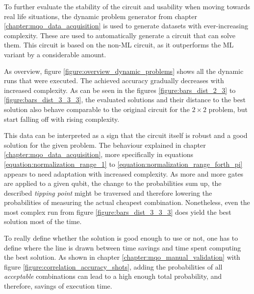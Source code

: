 To further evaluate the stability of the circuit and usability when moving towards real life situations, the dynamic problem generator from chapter \ref{chapter:mqo_data_acquisition} is used to generate datasets with ever-increasing complexity. These are used to automatically generate a circuit that can solve them. This circuit is based on the non-ML circuit, as it outperforms the ML variant by a considerable amount. \par
As overview, figure \ref{figure:overview_dynamic_problems} shows all the dynamic runs that were executed. The achieved accuracy gradually decreases with increased complexity. As can be seen in the figures \ref{figure:bars_dist_2_3} to \ref{figure:bars_dist_3_3_3}, the evaluated solutions and their distance to the best solution also behave comparable to the original circuit for the $2\times2$ problem, but start falling off with rising complexity. \par
This data can be interpreted as a sign that the circuit itself is robust and a good solution for the given problem. The behaviour explained in chapter \ref{chapter:mqo_data_acquisition}, more specifically in equations \ref{equation:normalization_range_1} to \ref{equation:normalization_range_forth_pi} appears to need adaptation with increased complexity. As more and more gates are applied to a given qubit, the change to the probabilities sum up, the described \emph{tipping point} might be traversed and therefore lowering the probabilities of measuring the actual cheapest combination. Nonetheless, even the most complex run from figure \ref{figure:bars_dist_3_3_3} does yield the best solution most of the time. \par
To really define whether the solution is good enough to use or not, one has to define where the line is drawn between time savings and time spent computing the best solution. As shown in chapter \ref{chapter:mqo_manual_validation} with figure \ref{figure:correlation_accuracy_shots}, adding the probabilities of all \emph{acceptable} combinations can lead to a high enough total probability, and therefore, savings of execution time.


